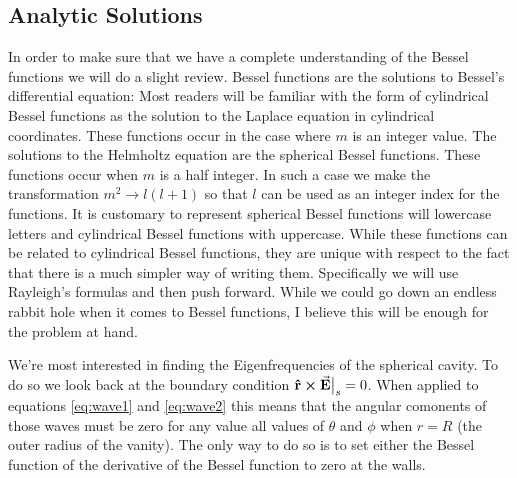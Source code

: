 \subsection{Analytic Solutions}

In order to make sure that we have a complete understanding of the Bessel functions we will do a slight review. Bessel functions are the solutions to Bessel's differential equation:
Most readers will be familiar with the form of cylindrical Bessel functions as the solution to the Laplace equation in cylindrical coordinates. These functions occur in the case where $m$ is an integer value. The solutions to the Helmholtz equation are the spherical Bessel functions. These functions occur when $m$ is a half integer. In such a case we make the transformation $m^2\to l(l+1)$ so that $l$ can be used as an integer index for the functions. It is customary to represent spherical Bessel functions will lowercase letters and cylindrical Bessel functions with uppercase\cite{handbook}. While these functions can be related to cylindrical Bessel functions, they are unique with respect to the fact that there is a much simpler way of writing them. Specifically we will use Rayleigh's formulas and then push forward.
While we could go down an endless rabbit hole when it comes to Bessel functions, I believe this will be enough for the problem at hand.

We're most interested in finding the Eigenfrequencies of the spherical cavity. To do so we look back at the boundary condition $\vu{r}\cross \va{E}\big{|}_s=0$. When applied to equations \eqref{eq:wave1} and \eqref{eq:wave2} this means that the angular comonents of those waves must be zero for any value all values of $\theta$ and $\phi$ when $r=R$ (the outer radius of the vanity). The only way to do so is to set either the Bessel function of the derivative of the Bessel function to zero at the walls.

